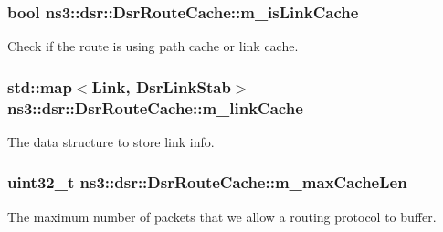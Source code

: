 \subsubsection[{\texorpdfstring{m\+\_\+is\+Link\+Cache}{m_isLinkCache}}]{\setlength{\rightskip}{0pt plus 5cm}bool ns3\+::dsr\+::\+Dsr\+Route\+Cache\+::m\+\_\+is\+Link\+Cache\hspace{0.3cm}{\ttfamily [private]}}\hypertarget{classns3_1_1dsr_1_1DsrRouteCache_aa30aef1d07ad115a3697a5ddaaaa755a}{}\label{classns3_1_1dsr_1_1DsrRouteCache_aa30aef1d07ad115a3697a5ddaaaa755a}


Check if the route is using path cache or link cache. 

\subsubsection[{\texorpdfstring{m\+\_\+link\+Cache}{m_linkCache}}]{\setlength{\rightskip}{0pt plus 5cm}std\+::map$<${\bf Link}, {\bf Dsr\+Link\+Stab}$>$ ns3\+::dsr\+::\+Dsr\+Route\+Cache\+::m\+\_\+link\+Cache\hspace{0.3cm}{\ttfamily [private]}}\hypertarget{classns3_1_1dsr_1_1DsrRouteCache_a0cce90def8da7bd0953a59cf1cfd2a66}{}\label{classns3_1_1dsr_1_1DsrRouteCache_a0cce90def8da7bd0953a59cf1cfd2a66}


The data structure to store link info. 

\subsubsection[{\texorpdfstring{m\+\_\+max\+Cache\+Len}{m_maxCacheLen}}]{\setlength{\rightskip}{0pt plus 5cm}uint32\+\_\+t ns3\+::dsr\+::\+Dsr\+Route\+Cache\+::m\+\_\+max\+Cache\+Len\hspace{0.3cm}{\ttfamily [private]}}\hypertarget{classns3_1_1dsr_1_1DsrRouteCache_a7c2e4d18d325c59346bde655057682c2}{}\label{classns3_1_1dsr_1_1DsrRouteCache_a7c2e4d18d325c59346bde655057682c2}


The maximum number of packets that we allow a routing protocol to buffer. 

